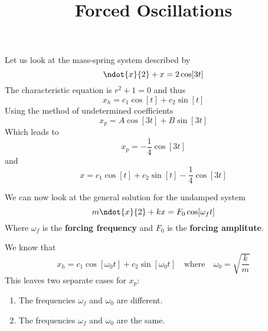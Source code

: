 \documentclass{beamer}
\title[MATH 2250 - Section 4.6]{Forced Oscillations}
\begin{document}
\begin{frame}
  \titlepage
\end{frame}

\begin{frame}
\begin{example}
Let us look at the mass-spring system described by
\begin{equation*}
\ndot{x}{2}+x=2\cos[3t]
\end{equation*}\pause
The characteristic equation is $r^2+1=0$ and thus
\begin{equation*}
x_h=c_1\cos[t]+c_2\sin[t]
\end{equation*}\pause
Using the method of undetermined coefficients
\begin{equation*}
x_p=A\cos[3t]+B\sin[3t]
\end{equation*}\pause
Which leads to
\begin{equation*}
x_p=-\dfrac{1}{4}\cos[3t]
\end{equation*}\pause
and 
\begin{equation*}
x=c_1\cos[t]+c_2\sin[t]-\dfrac{1}{4}\cos[3t]
\end{equation*}
\end{example}
\end{frame}

\begin{frame}
\begin{block}{}
We can now look at the general solution for the undamped system
\begin{equation*}
m\ndot{x}{2}+kx=F_0\cos[\omega_f t]
\end{equation*}
Where $\omega_f$ is the \textbf{forcing frequency} and $F_0$ is the \textbf{forcing amplitute}.\pause

\vspace{2mm}
We know that
\begin{equation*}
x_h=c_1\cos[\omega_0 t]+c_2\sin[\omega_0 t]
\quad\text{where}\quad
\omega_0=\sqrt{\dfrac{k}{m}}
\end{equation*}\pause
This leaves two separate cases for $x_p$:
\begin{enumerate}
\item The frequencies $\omega_f$ and $\omega_0$ are different.
\item The frequencies $\omega_f$ and $\omega_0$ are the same.
\end{enumerate}
\end{block}
\end{frame}
\end{document}
